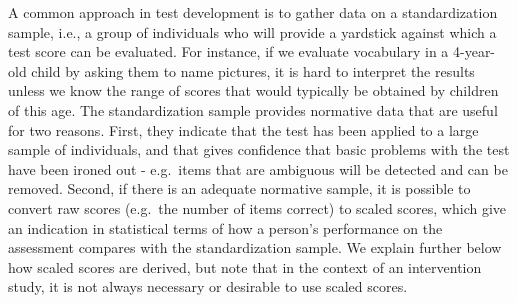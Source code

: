 \documentclass{krantz}
\begin{document}
A common approach in test development is to gather data on a standardization sample, i.e., a group of individuals who will provide a yardstick against which a test score can be evaluated. For instance, if we evaluate vocabulary in a 4-year-old child by asking them to name pictures, it is hard to interpret the results unless we know the range of scores that would typically be obtained by children of this age. The standardization sample provides normative data that are useful for two reasons. First, they indicate that the test has been applied to a large sample of individuals, and that gives confidence that basic problems with the test have been ironed out - e.g.~items that are ambiguous will be detected and can be removed. Second, if there is an adequate normative sample, it is possible to convert raw scores (e.g.~the number of items correct) to scaled scores, which give an indication in statistical terms of how a person's performance on the assessment compares with the standardization sample. We explain further below how scaled scores are derived, but note that in the context of an intervention study, it is not always necessary or desirable to use scaled scores.
\end{document}
